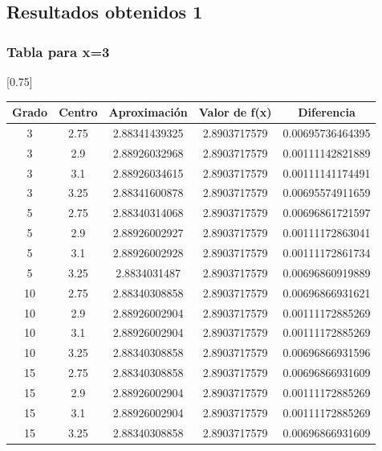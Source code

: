 \documentclass{beamer}
\begin{document}
\subsection{Resultados obtenidos 1}
\begin{frame}
\frametitle{Tabla para x=3}

\begin{table}[htb]
\begin{center}
  \scalebox{0.75}[0.75]{
  \begin{tabular}{|c|c|c|c|c|} %
  \hline
         Grado  &  Centro  &  Aproximación    &  Valor de f(x)  &  Diferencia        \\ \hline
            3   &   2.75   &  2.88341439325   &  2.8903717579   &  0.00695736464395  \\ \hline
            3   &   2.9    &  2.88926032968   &  2.8903717579   &  0.00111142821889  \\ \hline
            3   &   3.1    &  2.88926034615   &  2.8903717579   &  0.00111141174491  \\ \hline
            3   &   3.25   &  2.88341600878   &  2.8903717579   &  0.00695574911659  \\ \hline
            5   &   2.75   &  2.88340314068   &  2.8903717579   &  0.00696861721597  \\ \hline
            5   &   2.9    &  2.88926002927   &  2.8903717579   &  0.00111172863041  \\ \hline
            5   &   3.1    &  2.88926002928   &  2.8903717579   &  0.00111172861734  \\ \hline
            5   &   3.25   &  2.8834031487    &  2.8903717579   &  0.00696860919889  \\ \hline
            10  &   2.75   &  2.88340308858   &  2.8903717579   &  0.00696866931621  \\ \hline
            10  &   2.9    &  2.88926002904   &  2.8903717579   &  0.00111172885269  \\ \hline
            10  &   3.1    &  2.88926002904   &  2.8903717579   &  0.00111172885269  \\ \hline
            10  &   3.25   &  2.88340308858   &  2.8903717579   &  0.00696866931596  \\ \hline
            15  &   2.75   &  2.88340308858   &  2.8903717579   &  0.00696866931609  \\ \hline
            15  &   2.9    &  2.88926002904   &  2.8903717579   &  0.00111172885269  \\ \hline
            15  &   3.1    &  2.88926002904   &  2.8903717579   &  0.00111172885269  \\ \hline
            15  &   3.25   &  2.88340308858   &  2.8903717579   &  0.00696866931609  \\ \hline
   \end{tabular}
   }
   \label{Tabla2}
   \end{center}
\end{table}
\end{frame}
\end{document}
